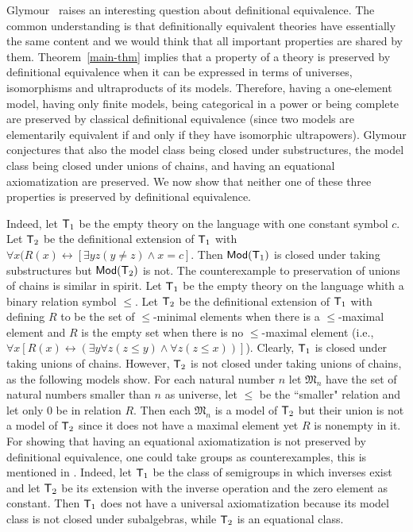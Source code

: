 \documentclass[12pt,leqno]{article}
\newcommand{\Mm}{\mbox{$\mathfrak M$}}
\newcommand{\T}{\mbox{\sf T}}
\newcommand{\Mod}{\mbox{\sf Mod}}
\begin{document}
Glymour~\cite{Gly} raises an interesting question about definitional equivalence. The common understanding is that definitionally equivalent theories have essentially the same content and we would think that all important properties are shared by them. %
Theorem~\ref{main-thm} implies that a property of a theory is preserved by definitional equivalence when it can be expressed in terms of universes, isomorphisms and ultraproducts of its models. Therefore, having a one-element model, having only finite models, being categorical in a power or being complete are preserved by classical definitional equivalence (since two models are elementarily equivalent if and only if they have isomorphic ultrapowers). Glymour \cite[p.296]{Gly} conjectures that also the model class being closed under substructures, the model class being closed under unions of chains, and having an equational axiomatization are preserved. We now show that neither one of these three properties is preserved by definitional equivalence.

Indeed, let $\T_1$ be the empty theory on the language with one constant symbol $c$. Let $\T_2$ be the definitional extension of $\T_1$ with
$\forall x(R(x)\leftrightarrow [\exists yz(y\ne z)\land x=c]$. Then $\Mod(\T_1)$ is closed under taking substructures but $\Mod(\T_2)$ is not. The counterexample to preservation of unions of chains is similar in spirit. Let $\T_1$ be the empty theory on the language whith a binary relation symbol $\le$. Let $\T_2$ be the definitional extension of $\T_1$ with defining $R$ to be the set of $\le$-minimal elements when there is a $\le$-maximal element and $R$ is the empty set when there is no $\le$-maximal element (i.e., $\forall x[R(x)\leftrightarrow(\exists y\forall z(z\le y)\land \forall z(z\le x))]$). Clearly, $\T_1$ is closed under taking unions of chains. However, $\T_2$ is not closed under taking unions of chains, as the following models show. For each natural number $n$ let $\Mm_n$ have the set of natural numbers smaller than $n$ as universe, let $\le$ be the ``smaller" relation and let only $0$ be in relation $R$. Then each $\Mm_n$ is a model of $\T_2$ but their union is not a model of $\T_2$ since it does not have a maximal element yet $R$ is nonempty in it. For showing that having an equational axiomatization is not preserved by definitional equivalence, %
one could take groups as counterexamples, this is mentioned in \cite[p.56]{HMT71}. Indeed, let  $\T_1$ be the class of semigroups in which inverses exist and let $\T_2$ be its extension with the inverse operation and the zero element as constant. Then $\T_1$ does not have a universal axiomatization because its model class is not closed under subalgebras, while $\T_2$ is an equational class.
\end{document}
